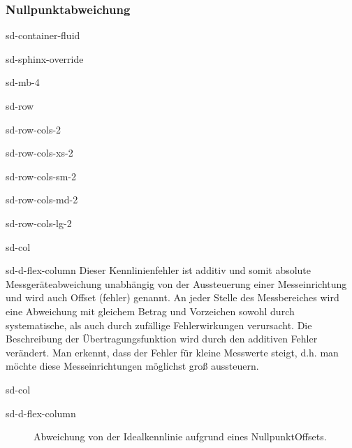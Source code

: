 \documentclass[letterpaper,10pt,english]{jupyterBook}
\let\sphinxpxdimen\pdfpxdimen\else\newdimen\sphinxpxdimen
\begin{document}
\subsubsection{Nullpunktabweichung}
\label{\detokenize{content/2_realeKennlinie:nullpunktabweichung}}
\begin{sphinxuseclass}{sd-container-fluid}
\begin{sphinxuseclass}{sd-sphinx-override}
\begin{sphinxuseclass}{sd-mb-4}
\begin{sphinxuseclass}{sd-row}
\begin{sphinxuseclass}{sd-row-cols-2}
\begin{sphinxuseclass}{sd-row-cols-xs-2}
\begin{sphinxuseclass}{sd-row-cols-sm-2}
\begin{sphinxuseclass}{sd-row-cols-md-2}
\begin{sphinxuseclass}{sd-row-cols-lg-2}
\begin{sphinxuseclass}{sd-col}
\begin{sphinxuseclass}{sd-d-flex-column}
\sphinxAtStartPar
Dieser Kennlinienfehler ist additiv und somit absolute Messgeräteabweichung unabhängig von der Aussteuerung einer Messeinrichtung und wird auch Offset (\sphinxhyphen{}fehler) genannt. An jeder Stelle des Messbereiches wird eine Abweichung mit gleichem Betrag und Vorzeichen sowohl durch systematische, als auch durch zufällige Fehlerwirkungen verursacht. Die Beschreibung der  Übertragungsfunktion wird durch den additiven Fehler verändert. Man erkennt, dass der  Fehler für kleine Messwerte steigt, d.h. man möchte diese Messeinrichtungen möglichst groß aussteuern.

\end{sphinxuseclass}
\end{sphinxuseclass}
\begin{sphinxuseclass}{sd-col}
\begin{sphinxuseclass}{sd-d-flex-column}
\begin{figure}[htbp]
\centering
\capstart

\noindent\sphinxincludegraphics[width=200\sphinxpxdimen]{{nullpktabw}.jpg}
\caption{Abweichung von der Idealkennlinie aufgrund eines Nullpunkt\sphinxhyphen{}Offsets.}\label{\detokenize{content/2_realeKennlinie:nullpktabw}}\end{figure}

\end{sphinxuseclass}
\end{sphinxuseclass}
\end{sphinxuseclass}
\end{sphinxuseclass}
\end{sphinxuseclass}
\end{sphinxuseclass}
\end{sphinxuseclass}
\end{sphinxuseclass}
\end{sphinxuseclass}
\end{sphinxuseclass}
\end{sphinxuseclass}
\end{document}
